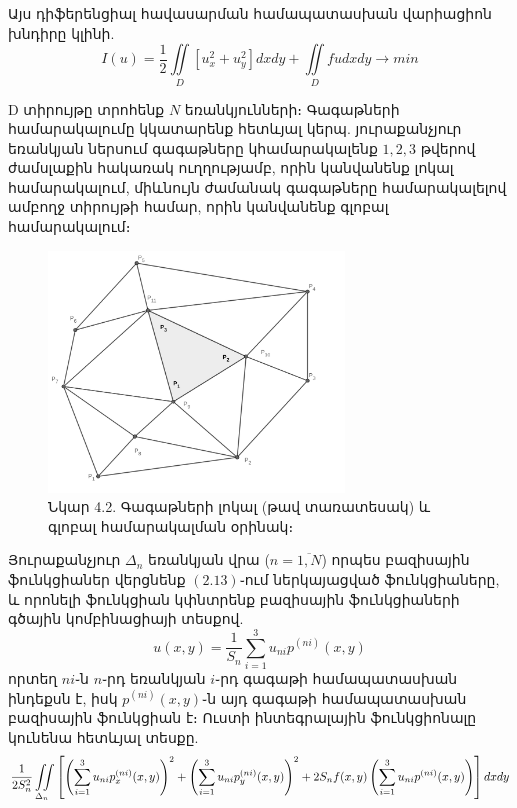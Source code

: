\documentclass[fleqn, bachelor,subf,12pt,notitlepage]{article}
\newcommand\scalemath[2]{\scalebox{#1}{\mbox{\ensuremath{\displaystyle #2}}}}
\begin{document}
Այս դիֆերենցիալ հավասարման  համապատասխան վարիացիոն խնդիրը կլինի.
\begin{equation}
I(u) = \frac{1}{2}\iint \limits_{D} \left[u_x^2 + u_y^2 \right]dxdy + \iint \limits_{D} fudxdy \longrightarrow min
\end{equation}

D տիրույթը տրոհենք $N$ եռանկյունների։ Գագաթների համարակալումը կկատարենք հետևյալ կերպ. յուրաքանչյուր եռանկյան ներսում գագաթները կհամարակալենք $1, 2, 3$ թվերով ժամսլաքին հակառակ ուղղությամբ, որին կանվանենք լոկալ համարակալում, միևնույն ժամանակ գագաթները համարակալելով ամբողջ տիրույթի համար, որին կանվանենք գլոբալ համարակալում։ 
\begin{figure}[H]
\centering
\includegraphics[width=0.7\textwidth]{images/global_and_local_numbering}
\captionsetup{labelformat=empty}
\caption{Նկար 4.2. Գագաթների լոկալ (թավ տառատեսակ) և գլոբալ համարակալման օրինակ։}
\end{figure}
Յուրաքանչյուր $\Delta_{n}$ եռանկյան վրա ($n=\overline{1, N}$) որպես բազիսային ֆունկցիաներ վերցնենք $\left(2.13\right)$֊ում ներկայացված ֆունկցիաները, և որոնելի ֆունկցիան կփնտրենք բազիսային ֆունկցիաների գծային կոմբինացիայի տեսքով.
\begin{equation}
u(x, y) = \dfrac{1}{S_{n}}\sum_{i=1}^{3}u_{ni}p^{(ni)}(x,y)
\end{equation}
որտեղ $ni$֊ն $n$֊րդ եռանկյան $i$֊րդ գագաթի համապատասխան ինդեքսն է, իսկ $p^{(ni)}(x,y)$֊ն այդ գագաթի համապատասխան բազիսային ֆունկցիան է։
Ուստի ինտեգրալային ֆունկցիոնալը կունենա հետևյալ տեսքը.
\begin{equation}
$$\scalemath{0.95}{\frac{1}{2S_{n}^{2}} \iint \limits_{\Delta_{n}}\left[\left(\sum_{i=1}^{3}u_{ni}p^{(ni)}_{x}(x,y)\right)^2 + \left(\sum_{i=1}^{3}u_{ni}p^{(ni)}_{y}(x,y)\right)^2 +2S_{n}f(x,y)\left(\sum_{i=1}^{3}u_{ni}p^{(ni)}(x,y)\right)\right]dxdy}
\end{equation}
\end{document}
